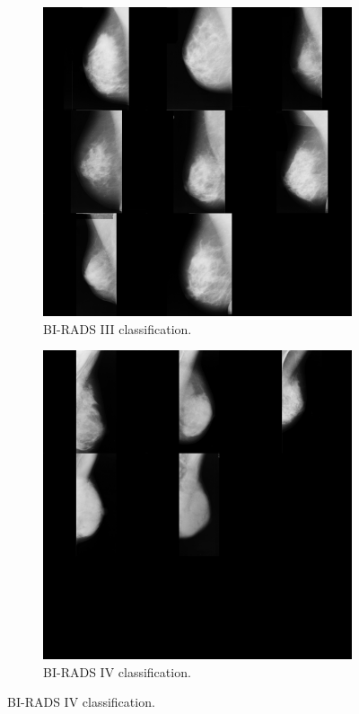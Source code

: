 \begin{figure}[H]
    \begin{subfigure}[t]{0.3\textwidth}
      \includegraphics[width=\textwidth]{Appendix5/sample3/big_scan_sample3.png}
      \caption{BI-RADS III classification.}
      \label{fig:app-sample3-input}
    \end{subfigure}
    \begin{subfigure}[t]{0.3\textwidth}
      \includegraphics[width=\textwidth]{Appendix5/sample4/big_scan_sample4.png}
      \caption{BI-RADS IV classification.}
      \label{fig:app-sample4-input}
    \end{subfigure}
    \label{fig:all-input-imgs}
\end{figure}

